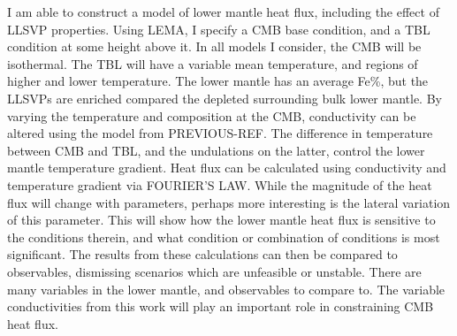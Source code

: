 I am able to construct a model of lower mantle heat flux, including the effect of LLSVP properties. Using LEMA, I specify a CMB base condition, and a TBL condition at some height above it. In all models I consider, the CMB will be isothermal. The TBL will have a variable mean temperature, and regions of higher and lower temperature. The lower mantle has an average Fe\%, but the LLSVPs are enriched compared the depleted surrounding bulk lower mantle. By varying the temperature and composition at the CMB, conductivity can be altered using the model from PREVIOUS-REF. The difference in temperature between CMB and TBL, and the undulations on the latter, control the lower mantle temperature gradient. Heat flux can be calculated using conductivity and temperature gradient via FOURIER'S LAW. While the magnitude of the heat flux will change with parameters, perhaps more interesting is the lateral variation of this parameter. This will show how the lower mantle heat flux is sensitive to the conditions therein, and what condition or combination of conditions is most significant. The results from these calculations can then be compared to observables, dismissing scenarios which are unfeasible or unstable. There are many variables in the lower mantle, and observables to compare to. The variable conductivities from this work will play an important role in constraining CMB heat flux.





